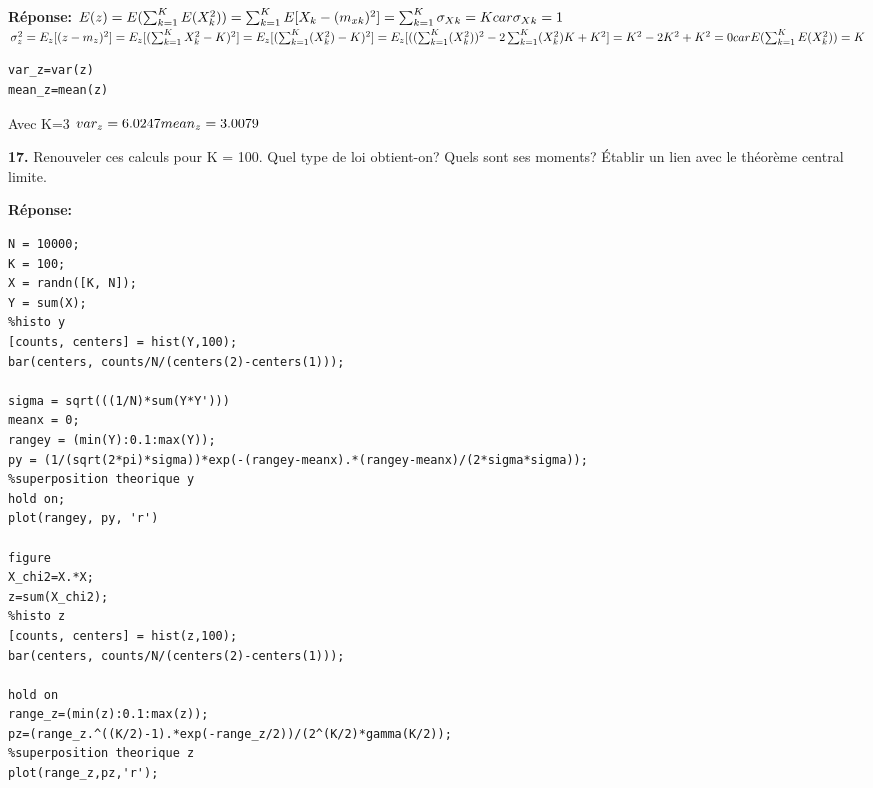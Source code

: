 \documentclass[12pt]{article}
\begin{document}
\smallbreak
\textbf{Réponse:}
$
\\
E(z)=E(\sum_{k=1}^{K}E(X_k^2))=\sum_{k=1}^{K}E[X_k -(m_{xk})^2]=\sum_{k=1}^{K}\sigma_{Xk}=K\\car  \sigma_{Xk}=1\\
$
$
\sigma_z^2=E_z[(z-m_z)^2]=E_z[(\sum_{k=1}^K X_k^2-K)^2]\\
=E_z[(\sum_{k=1}^K (X_k^2) - K)^2]\\
=E_z[((\sum_{k=1}^K (X_k^2))^2 -2 \sum_{k=1}^K (X_k^2) K + K^2]\\
=K^2-2K^2+K^2=0\\ car E(\sum_{k=1}^{K}E(X_k^2))=K
$

\begin{lstlisting}[style=Matlab-editor]
var_z=var(z)
mean_z=mean(z)
\end{lstlisting}

Avec K=3
$
\\ var_z = 6.0247\\
mean_z = 3.0079
$
\smallbreak

\textbf{17.} Renouveler ces calculs pour K = 100. Quel type de loi obtient-on? Quels sont ses moments? Établir un lien avec le théorème central limite.

\smallbreak
\textbf{Réponse:}
\begin{lstlisting}[style=Matlab-editor]
N = 10000;
K = 100;
X = randn([K, N]);
Y = sum(X);
%histo y
[counts, centers] = hist(Y,100);
bar(centers, counts/N/(centers(2)-centers(1)));

sigma = sqrt(((1/N)*sum(Y*Y')))
meanx = 0;
rangey = (min(Y):0.1:max(Y));
py = (1/(sqrt(2*pi)*sigma))*exp(-(rangey-meanx).*(rangey-meanx)/(2*sigma*sigma));
%superposition theorique y
hold on;
plot(rangey, py, 'r')

figure
X_chi2=X.*X;
z=sum(X_chi2);
%histo z
[counts, centers] = hist(z,100);
bar(centers, counts/N/(centers(2)-centers(1)));

hold on
range_z=(min(z):0.1:max(z));
pz=(range_z.^((K/2)-1).*exp(-range_z/2))/(2^(K/2)*gamma(K/2));
%superposition theorique z
plot(range_z,pz,'r');
\end{lstlisting}

\clearpage
\end{document}

